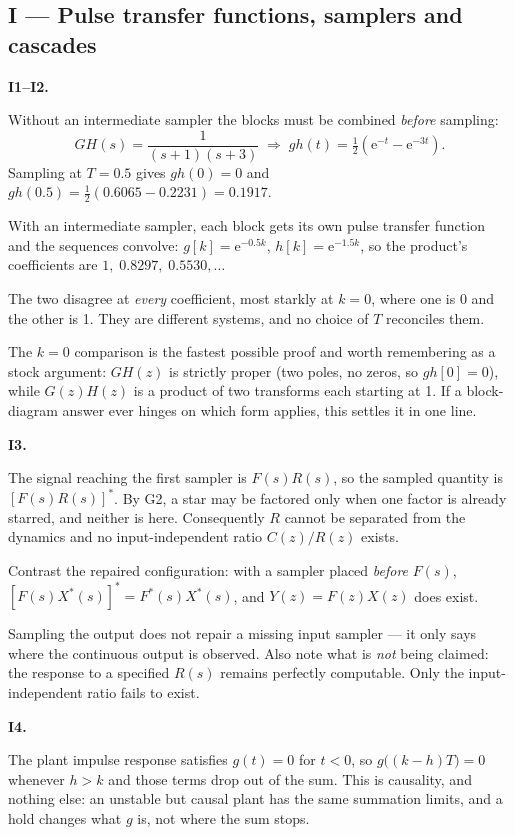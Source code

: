 \documentclass[10pt]{article}
\newcommand{\e}{\mathrm{e}}
\newcommand{\src}[1]{{\small\color{gray}[PDF pp.~#1]}}
\newcommand{\itemhead}[2]{\par\medskip\noindent\textbf{#1}\quad\src{#2}\par\nopagebreak}
\newcommand{\wrong}[1]{\par\smallskip\noindent{\color{red!55!black}\textbf{If you missed it.}} #1\par}
\begin{document}
\subsection{I --- Pulse transfer functions, samplers and cascades}

\itemhead{I1--I2.}{117--121}
Without an intermediate sampler the blocks must be combined \emph{before} sampling:
\[
GH(s)=\frac{1}{(s+1)(s+3)}
\;\Longrightarrow\;
gh(t)=\tfrac12\left(\e^{-t}-\e^{-3t}\right).
\]
Sampling at \(T=0.5\) gives \(gh(0)=0\) and
\(gh(0.5)=\tfrac12(0.6065-0.2231)=0.1917\).

With an intermediate sampler, each block gets its own pulse transfer function and
the sequences convolve: \(g[k]=\e^{-0.5k}\), \(h[k]=\e^{-1.5k}\), so the product's
coefficients are \(1,\;0.8297,\;0.5530,\dots\)

The two disagree at \emph{every} coefficient, most starkly at \(k=0\), where one is 0
and the other is 1. They are different systems, and no choice of \(T\) reconciles
them.
\wrong{The \(k=0\) comparison is the fastest possible proof and worth remembering as
a stock argument: \(GH(z)\) is strictly proper (two poles, no zeros, so \(g h[0]=0\)),
while \(G(z)H(z)\) is a product of two transforms each starting at 1. If a
block-diagram answer ever hinges on which form applies, this settles it in one line.}

\itemhead{I3.}{107--110, 126}
The signal reaching the first sampler is \(F(s)R(s)\), so the sampled quantity is
\(\left[F(s)R(s)\right]^{*}\). By G2, a star may be factored only when one factor is
already starred, and neither is here. Consequently \(R\) cannot be separated from the
dynamics and no input-independent ratio \(C(z)/R(z)\) exists.

Contrast the repaired configuration: with a sampler placed \emph{before} \(F(s)\),
\(\left[F(s)X^{*}(s)\right]^{*}=F^{*}(s)X^{*}(s)\), and \(Y(z)=F(z)X(z)\) does exist.
\wrong{Sampling the output does not repair a missing input sampler --- it only says
where the continuous output is observed. Also note what is \emph{not} being claimed:
the response to a specified \(R(s)\) remains perfectly computable. Only the
input-independent ratio fails to exist.}

\itemhead{I4.}{95--100}
The plant impulse response satisfies \(g(t)=0\) for \(t<0\), so
\(g\bigl((k-h)T\bigr)=0\) whenever \(h>k\) and those terms drop out of the sum. This
is causality, and nothing else: an unstable but causal plant has the same summation
limits, and a hold changes what \(g\) is, not where the sum stops.
\end{document}
